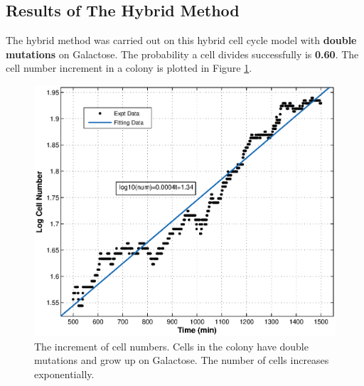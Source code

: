 \documentclass[12pt]{article}
\begin{document}
\subsection{Results of The Hybrid Method}
The hybrid method was carried out on this hybrid cell cycle model with \textbf{double mutations} on Galactose.
The probability a cell divides successfully is \textbf{0.60}. The cell number increment in a colony is 
plotted in Figure \ref{fig:ga_fit}.
\begin{figure}[H]
  \centering
  \includegraphics[scale=.8]{./figure/num_ga_fit.eps}
  \caption{The increment of cell numbers. Cells in the colony have double mutations and grow up on Galactose.
  The number of cells increases exponentially.}
  \label{fig:ga_fit}
\end{figure}
\end{document}
